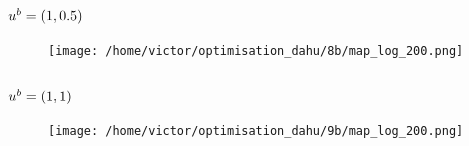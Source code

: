 \documentclass[../../Main_ManuscritThese.tex]{subfiles}
\begin{document}
\subsection*{$u^b=(1, 0.5)$}
\begin{figure}[ht]
  \centering
  \texttt{[image: /home/victor/optimisation\_dahu/8b/map\_log\_200.png]}
\end{figure}
\begin{figure}[ht]
  \centering
    \resizebox{1\textwidth}{!}{}
\end{figure}
\clearpage
\subsection*{$u^b=(1, 1)$}
\begin{figure}[ht]
  \centering
  \texttt{[image: /home/victor/optimisation\_dahu/9b/map\_log\_200.png]}
\end{figure}
\begin{figure}[ht]
  \centering
  \resizebox{1\textwidth}{!}{}
\end{figure}
\clearpage




\pagestyle{appendixStyle}



\subfileLocal{
	\pagestyle{empty}
	
	

}

\endgroup
\end{document}
